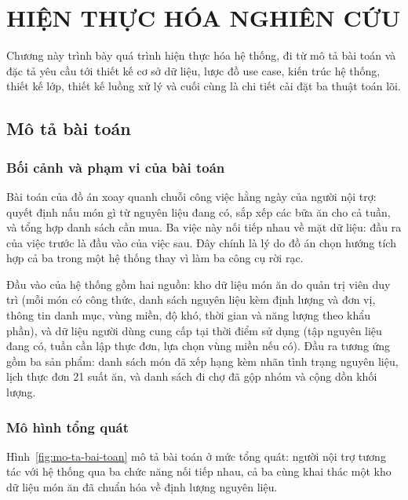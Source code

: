 \chapter{HIỆN THỰC HÓA NGHIÊN CỨU}
\label{ch:hien-thuc}

Chương này trình bày quá trình hiện thực hóa hệ thống, đi từ mô tả bài toán và
đặc tả yêu cầu tới thiết kế cơ sở dữ liệu, lược đồ use case, kiến trúc hệ thống,
thiết kế lớp, thiết kế luồng xử lý và cuối cùng là chi tiết cài đặt ba thuật toán
lõi.

\section{Mô tả bài toán}
\label{sec:mo-ta-bai-toan}

\subsection{Bối cảnh và phạm vi của bài toán}

Bài toán của đồ án xoay quanh chuỗi công việc hằng ngày của người nội trợ: quyết
định nấu món gì từ nguyên liệu đang có, sắp xếp các bữa ăn cho cả tuần, và tổng
hợp danh sách cần mua. Ba việc này nối tiếp nhau về mặt dữ liệu: đầu ra của việc
trước là đầu vào của việc sau. Đây chính là lý do đồ án chọn hướng tích hợp cả ba
trong một hệ thống thay vì làm ba công cụ rời rạc.

Đầu vào của hệ thống gồm hai nguồn: kho dữ liệu món ăn do quản trị viên duy trì
(mỗi món có công thức, danh sách nguyên liệu kèm định lượng và đơn vị, thông tin
danh mục, vùng miền, độ khó, thời gian và năng lượng theo khẩu phần), và dữ liệu
người dùng cung cấp tại thời điểm sử dụng (tập nguyên liệu đang có, tuần cần lập
thực đơn, lựa chọn vùng miền nếu có). Đầu ra tương ứng gồm ba sản phẩm: danh
sách món đã xếp hạng kèm nhãn tình trạng nguyên liệu, lịch thực đơn 21 suất ăn,
và danh sách đi chợ đã gộp nhóm và cộng dồn khối lượng.

\subsection{Mô hình tổng quát}

Hình~\ref{fig:mo-ta-bai-toan} mô tả bài toán ở mức tổng quát: người nội trợ tương
tác với hệ thống qua ba chức năng nối tiếp nhau, cả ba cùng khai thác một kho dữ
liệu món ăn đã chuẩn hóa về định lượng nguyên liệu.

